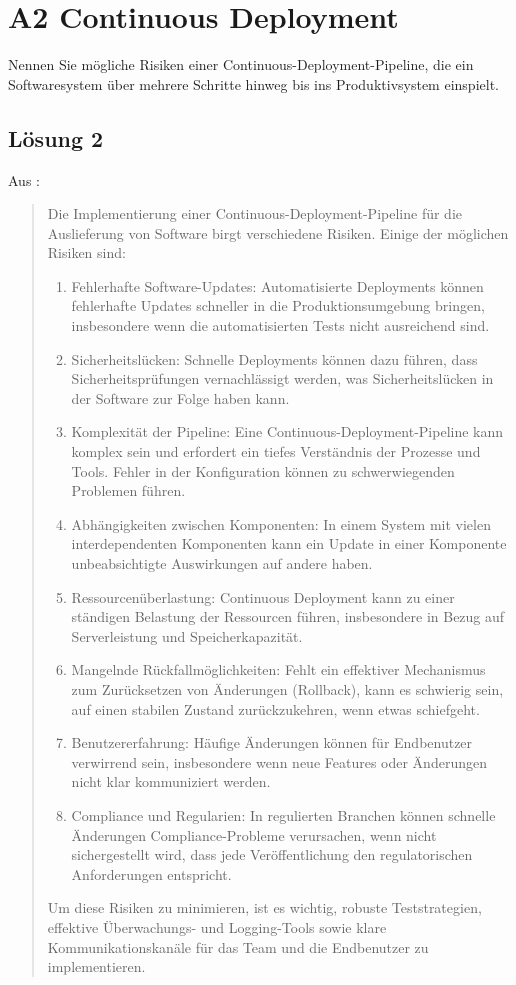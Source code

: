 \documentclass[main.tex]{subfiles}
\begin{document}
\section{A2 Continuous Deployment}
Nennen Sie mögliche Risiken einer Continuous-Deployment-Pipeline, die ein Softwaresystem
über mehrere Schritte hinweg bis ins Produktivsystem einspielt.

\subsection{Lösung 2}
Aus \cite{openai2023chatgpt4}:

\begin{quote}

Die Implementierung einer Continuous-Deployment-Pipeline für die Auslieferung von Software birgt verschiedene Risiken. Einige der möglichen Risiken sind:

\renewcommand{\labelenumi}{\arabic{enumi}.}
\begin{enumerate}
\item Fehlerhafte Software-Updates: Automatisierte Deployments können fehlerhafte Updates schneller in die Produktionsumgebung bringen, insbesondere wenn die automatisierten Tests nicht ausreichend sind.
\item Sicherheitslücken: Schnelle Deployments können dazu führen, dass Sicherheitsprüfungen vernachlässigt werden, was Sicherheitslücken in der Software zur Folge haben kann.
\item Komplexität der Pipeline: Eine Continuous-Deployment-Pipeline kann komplex sein und erfordert ein tiefes Verständnis der Prozesse und Tools. Fehler in der Konfiguration können zu schwerwiegenden Problemen führen.
\item Abhängigkeiten zwischen Komponenten: In einem System mit vielen interdependenten Komponenten kann ein Update in einer Komponente unbeabsichtigte Auswirkungen auf andere haben.
\item Ressourcenüberlastung: Continuous Deployment kann zu einer ständigen Belastung der Ressourcen führen, insbesondere in Bezug auf Serverleistung und Speicherkapazität.
\item Mangelnde Rückfallmöglichkeiten: Fehlt ein effektiver Mechanismus zum Zurücksetzen von Änderungen (Rollback), kann es schwierig sein, auf einen stabilen Zustand zurückzukehren, wenn etwas schiefgeht.
\item Benutzererfahrung: Häufige Änderungen können für Endbenutzer verwirrend sein, insbesondere wenn neue Features oder Änderungen nicht klar kommuniziert werden.
\item Compliance und Regularien: In regulierten Branchen können schnelle Änderungen Compliance-Probleme verursachen, wenn nicht sichergestellt wird, dass jede Veröffentlichung den regulatorischen Anforderungen entspricht.
\end{enumerate}

Um diese Risiken zu minimieren, ist es wichtig, robuste Teststrategien, effektive Überwachungs- und Logging-Tools sowie klare Kommunikationskanäle für das Team und die Endbenutzer zu implementieren.
\end{quote}
\end{document}
